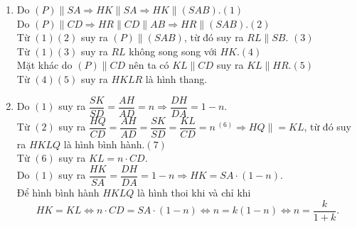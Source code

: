 \begin{bt}
{\begin{enumerate}
	Do $ABCD$ là hình bình hành suy ra $CD\parallel AB$, từ đó suy ra $\dfrac{PE}{EA}=\dfrac{PD}{AB}=\dfrac{1}{2}$.\hfill $(*)$\\
	Do $G$ là trọng tâm của tam giác $SCD$ suy ra $\dfrac{PG}{GS}=\dfrac{1}{2}$.\hfill $(**)$\\
	Từ $(*)(**)$ ta có $EG\parallel SA\Leftrightarrow EG\parallel (SAC)$.
	\item Do $(P)\parallel SA\Rightarrow HK\parallel SA\Rightarrow HK\parallel (SAB)$.\hfill $(1)$\\
	Do $(P)\parallel CD\Rightarrow HR\parallel CD\parallel AB\Rightarrow HR\parallel (SAB)$.\hfill $(2)$\\
	Từ $(1)(2)$ suy ra $(P)\parallel (SAB)$, từ đó suy ra $RL\parallel SB$. \hfill $(3)$\\
	Từ $(1)(3)$ suy ra $RL$ không song song với $HK$.\hfill $(4)$\\
	Mặt khác do $(P)\parallel CD$ nên ta có $KL\parallel CD$ suy ra $KL\parallel HR$.\hfill $(5)$\\
	Từ $(4)(5)$ suy ra $HKLR$ là hình thang.
	\item Do $(1)$ suy ra $\dfrac{SK}{SD}=\dfrac{AH}{AD}=n\Rightarrow \dfrac{DH}{DA}=1-n$.\\
	Từ $(2)$ suy ra $\dfrac{HQ}{CD}=\dfrac{AH}{AD}=\dfrac{SK}{SD}=\dfrac{KL}{CD}=n\, ^{(6)} \Rightarrow HQ\parallel = KL$, từ đó suy ra $HKLQ$ là hình bình hành.\hfill $(7)$\\
	Từ $(6)$ suy ra $KL=n\cdot CD$.\\
	Do $(1)$ suy ra $\dfrac{HK}{SA}=\dfrac{DH}{DA}=1-n\Rightarrow HK=SA\cdot (1-n)$.\\
	Để hình bình hành $HKLQ$ là hình thoi khi và chỉ khi $$HK=KL\Leftrightarrow n\cdot CD=SA\cdot (1-n)\Leftrightarrow n=k(1-n)\Leftrightarrow n=\dfrac{k}{1+k}.$$
	\end{enumerate}
}
\end{bt}

